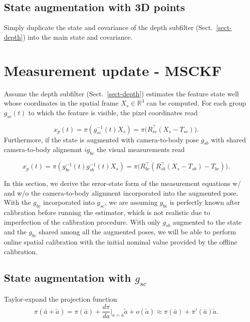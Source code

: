 \documentclass[letter,10pt]{article}
\newcommand{\real}{\mathbb{R}}
\begin{document}
\subsection{State augmentation with 3D points}

Simply duplicate the state and covariance of the depth subfilter (Sect.~\ref{sect-depth}) into the main state and covariance.


\section{Measurement update - MSCKF}
Assume the depth subfilter (Sect.~\ref{sect-depth}) estimates the feature state well whose coordinates in the spatial frame $X_s\in\real^3$ can be computed. For each group $g_{sc}(t)$ to which the feature is visible, the pixel coordinates read 

\begin{equation}
 x_p(t) = \pi(g_{sc}^{-1}(t)X_s) = \pi\big( R_{sc}^\top (X_s-T_{sc}) \big).
\end{equation}
Furthermore, if the state is augmented with camera-to-body pose $g_{sb}$ with shared camera-to-body alignemnt $ig_{bc}$ the visual measurements read

\begin{equation}
x_p(t) = \pi(g_{bc}^{-1}(t)g_{sb}^{-1}(t)X_s)=\pi\big(R_{bc}^\top (R_{sb}^\top(X_s-T_{sb}) - T_{bc})\big).
\end{equation}

In this section, we derive the error-state form of the measurement equations w/ and w/o the camera-to-body alignment incorporated into the augmented pose.  With the $g_{bc}$ incorporated into $g_{sc}$, we are assuming $g_{bc}$ is perfectly known after calibration before running the estimator, which is not realistic due to imperfection of the calibration procedure. With only $g_{sb}$ augmented to the state and the $g_{bc}$ shared among all the augmented poses, we will be able to perform online spatial calibration with the initial nominal value provided by the offline calibration.

\subsection{State augmentation with $g_{sc}$}

Taylor-expand the projection function
\begin{equation}
 \pi(\bar a + \tilde a) 
 = \pi(\bar a) + \frac{d \pi}{d a}|_{a=\bar a} \tilde a + o(\tilde a)
 \approx \pi(\bar a) + \pi'(\bar a) \tilde a.
\end{equation}
\end{document}
